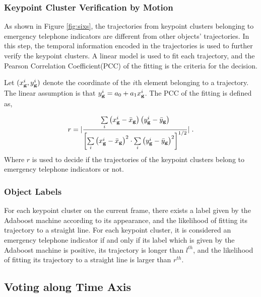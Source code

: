 \subsubsection{Keypoint Cluster Verification by Motion}

As shown in Figure \ref{fig:sixs}, the trajectories from keypoint clusters belonging to emergency telephone indicators are different from other objects' trajectories. In this step, the temporal information encoded in the trajectories is used to further verify the keypoint clusters. A linear model is used to fit each trajectory, and the Pearson Correlation Coefficient(PCC) of the fitting is the criteria for the decision.

Let $(x^i_{\bf{g}},y^i_{\bf{g}})$ denote the coordinate of the $i$th element belonging to a trajectory. The linear assumption is that $y^i_{\bf{g}}=a_0+a_1{x^i_{\bf{g}}}$. The PCC of the fitting is defined as,

\begin{equation}
r =| \frac{{\sum\limits_i {\left( {{x^i_{\bf{g}}} -  {\bar x_{\bf{g}}}} \right)\left( {{y^i_{\bf{g}}} -  {\bar y_{\bf{g}}}} \right)} }}{{{{\left[ {\sum\limits_i {{{\left( {{x^i_{\bf{g}}} -  {\bar x_{\bf{g}}}} \right)}^2} \cdot \sum\limits_i {{{\left( {{y^i_{\bf{g}}} -  {\bar y_{\bf{g}}}} \right)}^2}} } } \right]}^{1/2}}}}|\;.
\label{eq4}
\end{equation}
Where $r$ is used to decide if the trajectories of the keypoint clusters belong to emergency telephone indicators or not.



\subsubsection{Object Labels}

For each keypoint cluster on the current frame, there exists a label given by the Adaboost machine according to its appearance, and the likelihood of fitting its trajectory to a straight line.  For each keypoint cluster, it is considered an emergency telephone indicator if and only if its label which is given by the Adaboost machine is positive, its trajectory is longer than $l^{th}$, and the likelihood of fitting its trajectory to a straight line is larger than $r^{th}$.


\subsection{Voting along Time Axis}

